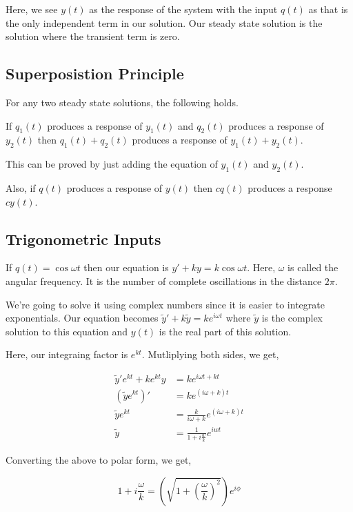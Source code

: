 Here, we see $y(t)$ as the response of the system with the input $q(t)$ as that is the only independent term in our solution.
Our steady state solution is the solution where the transient term is zero.

\subsection{Superposistion Principle}

For any two steady state solutions, the following holds.

If $q_1(t)$ produces a response of $y_1(t)$ 
and $q_2(t)$ produces a response of $y_2(t)$ 
then $q_1(t) + q_2(t)$ produces a response of $y_1(t) + y_2(t)$.

This can be proved by just adding the equation of $y_1(t)$ and $y_2(t)$.

Also, if $q(t)$ produces a response of $y(t)$ 
then $cq(t)$ produces a response $cy(t)$.


\subsection{Trigonometric Inputs}

If $q(t) = \cos \omega t$ then our equation is $y' + ky = k \cos \omega t$.
Here, $\omega$ is called the angular frequency.
It is the number of complete oscillations in the distance $2 \pi$.

We're going to solve it using complex numbers since it is easier to integrate exponentials.
Our equation becomes $\tilde{y}' + k\tilde{y} = k e^{i \omega t}$
where $\tilde{y}$ is the complex solution to this equation and $y(t)$ is the real part of this solution.

Here, our integraing factor is $e^{kt}$.
Mutliplying both sides, we get, 

\begin{align*}
    \tilde{y}' e^{kt} + k e^{kt} y & = k e^{i \omega t + kt} \\
    (\tilde{y} e^{kt})' & = k e^{(i \omega + k) t} \\
    \tilde{y} e^{kt} & =\frac{k}{i \omega + k} e^{(i \omega + k) t} \\
    \tilde{y} & = \frac{1}{1 + i \frac{w}{k}} e^{iwt}
\end{align*}

Converting the above to polar form, we get, 

$$ 1 + i \frac{\omega}{k} = \left( \sqrt{ 1 + \left( \frac{\omega}{k} \right)^2 } \right) e^{i \phi} $$

